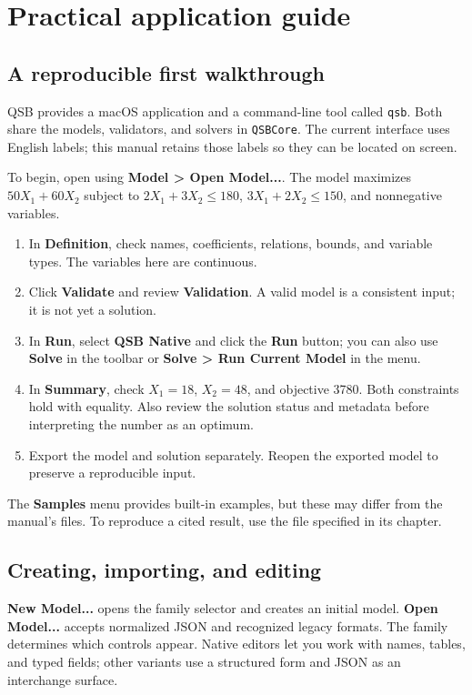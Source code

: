 \chapter{Practical application guide}
\label{chap:guia}

\section{A reproducible first walkthrough}
QSB provides a macOS application and a command-line tool called \texttt{qsb}.
Both share the models, validators, and solvers in \texttt{QSBCore}. The current
interface uses English labels; this manual retains those labels so they can be
located on screen.

To begin, open  using
\textbf{Model > Open Model...}. The model maximizes $50X_1+60X_2$ subject to
$2X_1+3X_2\leq180$, $3X_1+2X_2\leq150$, and nonnegative variables.
\begin{enumerate}
 \item In \textbf{Definition}, check names, coefficients, relations, bounds,
 and variable types. The variables here are continuous.
 \item Click \textbf{Validate} and review \textbf{Validation}. A valid model
 is a consistent input; it is not yet a solution.
 \item In \textbf{Run}, select \textbf{QSB Native} and click the \textbf{Run}
 button; you can also use \textbf{Solve} in the toolbar or
 \textbf{Solve > Run Current Model} in the menu.
 \item In \textbf{Summary}, check $X_1=18$, $X_2=48$, and objective 3780.
 Both constraints hold with equality. Also review the solution status and
 metadata before interpreting the number as an optimum.
 \item Export the model and solution separately. Reopen the exported model
 to preserve a reproducible input.
\end{enumerate}
The \textbf{Samples} menu provides built-in examples, but these may differ from
the manual's files. To reproduce a cited result, use the file specified in its
chapter.

\section{Creating, importing, and editing}
\textbf{New Model...} opens the family selector and creates an initial model.
\textbf{Open Model...} accepts normalized JSON and recognized legacy formats.
The family determines which controls appear. Native editors let you work with
names, tables, and typed fields; other variants use a structured form and JSON
as an interchange surface.

